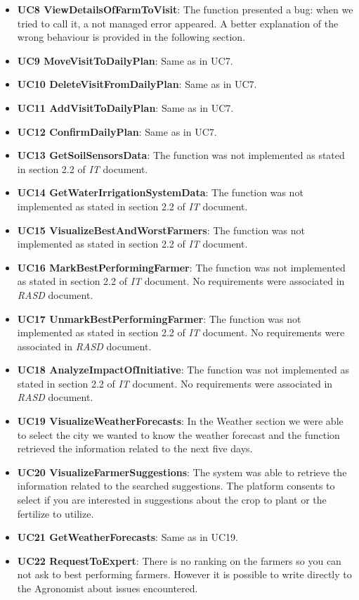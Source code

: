 \begin{itemize}
    \item \textbf{UC8 ViewDetailsOfFarmToVisit}: The function presented a bug: when we tried to call it, a not managed error appeared. A better explanation of the wrong behaviour is provided in the following section.
    \item \textbf{UC9 MoveVisitToDailyPlan}: Same as in UC7.
    \item \textbf{UC10 DeleteVisitFromDailyPlan}: Same as in UC7.
    \item \textbf{UC11 AddVisitToDailyPlan}: Same as in UC7.
    \item \textbf{UC12 ConfirmDailyPlan}: Same as in UC7.
    \item \textbf{UC13 GetSoilSensorsData}: The function was not implemented as stated in section 2.2 of \textit{IT} document.
    \item \textbf{UC14 GetWaterIrrigationSystemData}: The function was not implemented as stated in section 2.2 of \textit{IT} document.
    \item \textbf{UC15 VisualizeBestAndWorstFarmers}: The function was not implemented as stated in section 2.2 of \textit{IT} document.
    \item \textbf{UC16 MarkBestPerformingFarmer}: The function was not implemented as stated in section 2.2 of \textit{IT} document. No requirements were associated in \textit{RASD} document.
    \item \textbf{UC17 UnmarkBestPerformingFarmer}: The function was not implemented as stated in section 2.2 of \textit{IT} document. No requirements were associated in \textit{RASD} document.
    \item \textbf{UC18 AnalyzeImpactOfInitiative}: The function was not implemented as stated in section 2.2 of \textit{IT} document. No requirements were associated in \textit{RASD} document.
    \item \textbf{UC19 VisualizeWeatherForecasts}: In the Weather section we were able to select the city we wanted to know the weather forecast and the function retrieved the information related to the next five days.
    \item \textbf{UC20 VisualizeFarmerSuggestions}: The system was able to retrieve the information related to the searched suggestions. The platform consents to select if you are interested in suggestions about the crop to plant or the fertilize to utilize.
    \item \textbf{UC21 GetWeatherForecasts}: Same as in UC19.
    \item \textbf{UC22 RequestToExpert}: There is no ranking on the farmers so you can not ask to best performing farmers. However it is possible to write directly to the Agronomist about issues encountered.

\end{itemize}
